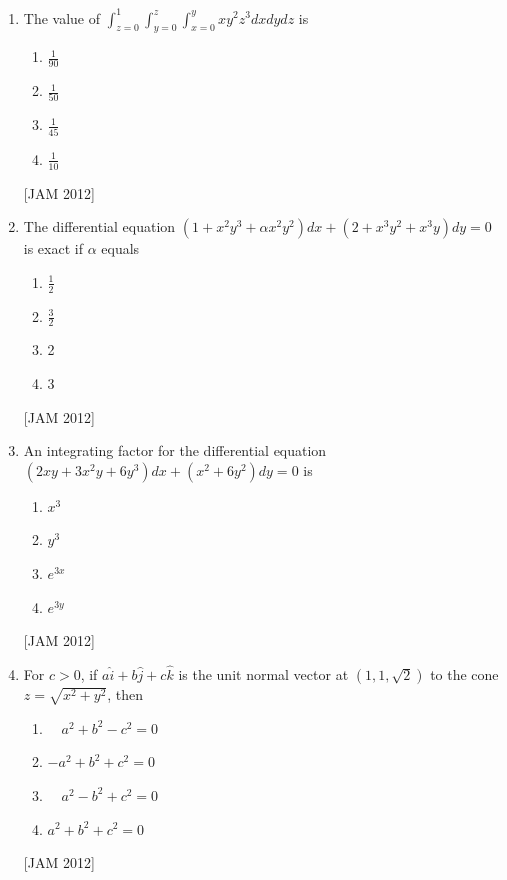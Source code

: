\begin{enumerate}
\item  The value of $\int_{z=0}^{1} \int_{y=0}^{z} \int_{x=0}^{y} x y^{2} z^{3} d x d y d z$ is 


\begin{enumerate}
    
\item $\frac{1}{90}$ 
\item $\frac{1}{50}$ 
\item $\frac{1}{45}$ 
\item $\frac{1}{10}$
\end{enumerate}
\hfill [JAM 2012]




\item  The differential equation $\left(1+x^{2} y^{3}+\alpha x^{2} y^{2}\right) d x+\left(2+x^{3} y^{2}+x^{3} y\right) d y=0$ is exact if $\alpha$ equals 


\begin{enumerate}
    
\item $\frac{1}{2}$ 
\item $\frac{3}{2}$ 
\item 2 
\item 3
\end{enumerate}
\hfill [JAM 2012]




\item  An integrating factor for the differential equation $\left(2 x y+3 x^{2} y+6 y^{3}\right) d x+\left(x^{2}+6 y^{2}\right) d y=0$ is 


\begin{enumerate}
    \item $x^{3}$ 
\item $y^{3}$ 
\item $e^{3 x}$ 
\item $e^{3 y}$
\end{enumerate}
\hfill [JAM 2012]




\item  For $c>0$, if $a \hat{i}+b \hat{j}+c \hat{k}$ is the unit normal vector at $(1,1, \sqrt{2})$ to the cone $z=\sqrt{x^{2}+y^{2}}$, then 


\begin{enumerate}
    \item $\quad a^{2}+b^{2}-c^{2}=0$ 
\item $-a^{2}+b^{2}+c^{2}=0$ 
\item $\quad a^{2}-b^{2}+c^{2}=0$ 
\item $a^{2}+b^{2}+c^{2}=0$
\end{enumerate}
\hfill [JAM 2012]






\end{enumerate}
